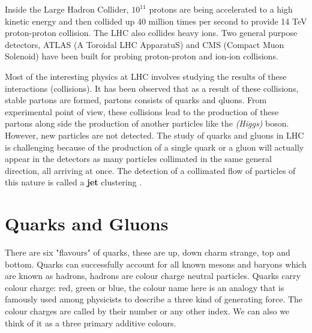 Inside the Large Hadron Collider, $10^{11}$ protons are being accelerated to a high kinetic energy and then collided up 40 million times per second to provide 14 \si{TeV} proton-proton collision. The LHC also collides heavy ions. Two general purpose detectors, ATLAS (A Toroidal LHC ApparatuS) \cite{Aad:2008zzm} and CMS (Compact Muon Solenoid) \cite{1748-0221-3-08-S08004} have been built for probing proton-proton and ion-ion collisions.
 
Most of the interesting physics at LHC involves studying the results of these interactions (collisions). It has been observed that as a result of these collisions, stable partons are formed, partons consists of quarks and qluons. From experimental point of view, these collisions lead to the production of these partons along side the production of another particles like the \emph{(Higgs)} boson. However, new particles are not detected.
The study of quarks and gluons in LHC is challenging because of the production of a single quark or a gluon will actually appear in the detectors as many particles collimated in the same general direction, all arriving at once. The detection of a collimated flow of particles of this nature is called a \textbf{jet} clustering\label{Lhc} \citep{Ellis:2007ib}.   



\section{Quarks and Gluons}

There are six "flavours" of quarks, these are up, down charm strange, top and bottom.
Quarks can successfully account for all known mesons and baryons which are known as hadrons, hadrons are colour charge neutral particles. 
%
%
Quarks carry colour charge: red, green or blue, the colour name here is an analogy  that is famously used among physicists to describe a three kind of generating force. The colour charges are called by their number or any other index. We can also we think of it as a three primary additive colours. 

